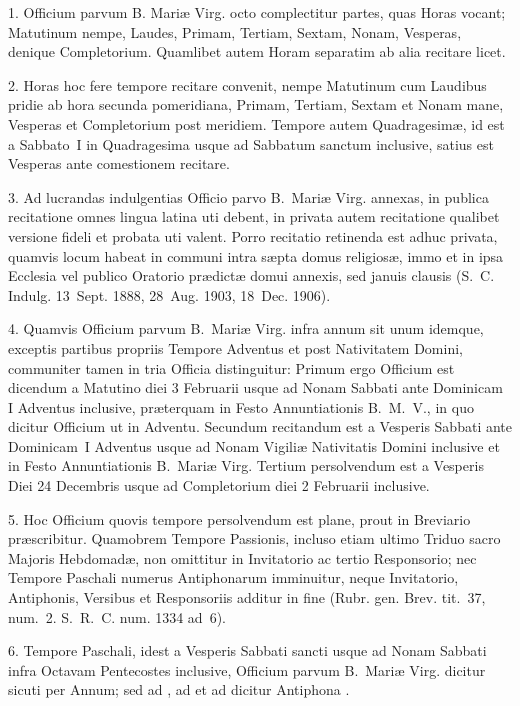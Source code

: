
\begin{multicols}{2}

1. Officium parvum B. Mariæ Virg. octo complectitur partes, quas Horas vocant;
Matutinum nempe, Laudes, Primam, Tertiam, Sextam, Nonam, Vesperas, denique
Completorium. Quamlibet autem Horam separatim ab alia recitare licet.

2. Horas hoc fere tempore recitare convenit, nempe Matutinum cum Laudibus 
pridie ab hora secunda pomeridiana, Primam, Tertiam, Sextam et Nonam mane,
Vesperas et Completorium post meridiem.
Tempore autem Quadragesimæ, id est a Sabbato~I in Quadragesima usque ad
Sabbatum sanctum inclusive, satius est Vesperas ante comestionem recitare.

3. Ad lucrandas indulgentias Officio parvo B.~Mariæ Virg. annexas, in publica
recitatione omnes lingua latina uti debent, in privata autem recitatione
qualibet versione fideli et probata uti valent.
Porro recitatio retinenda est adhuc privata, quamvis locum habeat in communi
intra sæpta domus religiosæ, immo et in ipsa Ecclesia vel publico Oratorio
prædictæ domui annexis, sed januis clausis (S.~C. Indulg. 13~Sept. 1888,
28~Aug. 1903, 18~Dec. 1906).

4. Quamvis Officium parvum B.~Mariæ Virg. infra annum sit unum idemque,
exceptis partibus propriis Tempore Adventus et post Nativitatem Domini,
communiter tamen in tria Officia distinguitur:
Primum ergo Officium est dicendum a Matutino diei 3 Februarii usque ad Nonam
Sabbati ante Dominicam I Adventus inclusive, præterquam in Festo Annuntiationis
B.~M.~V., in quo dicitur Officium ut in Adventu.
Secundum recitandum est a Vesperis Sabbati ante Dominicam~I Adventus usque ad
Nonam Vigiliæ Nativitatis Domini inclusive et in Festo Annuntiationis
B.~Mariæ Virg.
Tertium persolvendum est a Vesperis Diei 24 Decembris usque ad Completorium
diei 2 Februarii inclusive.

5. Hoc Officium quovis tempore persolvendum est plane, prout in Breviario
præscribitur. Quamobrem Tempore Passionis, incluso etiam ultimo Triduo 
sacro Majoris Hebdomadæ, non omittitur  in Invitatorio
ac tertio Responsorio; nec Tempore Paschali numerus Antiphonarum imminuitur,
neque Invitatorio, Antiphonis, Versibus et Responsoriis additur in fine
 (Rubr. gen. Brev. tit.~37, num.~2. S.~R.~C. num. 1334 ad~6).

6. Tempore Paschali, idest a Vesperis Sabbati sancti usque ad Nonam Sabbati
infra Octavam Pentecostes inclusive, Officium parvum B.~Mariæ Virg.
dicitur sicuti per Annum; sed ad , ad 
et ad  dicitur Antiphona .


\end{multicols}
